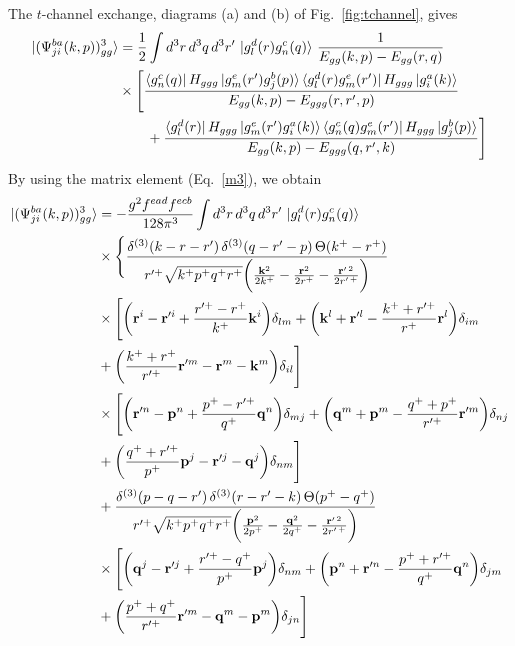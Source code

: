 \documentclass[a4paper,11pt]{article}
\def\v#1{\mathbf{#1}}
\begin{document}
{\noindent The $t$-channel exchange, diagrams (a) and (b) of Fig.~\ref{fig:tchannel}, gives
\begin{align}
\ket{(\Psi^{ba}_{ji}(k,p))^{3}_{gg}} & = \frac{1}{2}\int d^{3}r\, d^{3}q\, d^{3}r^{\prime}\, \ket{g^{d}_{l}(r)g^{c}_{n}(q)}\,\frac{1}{E_{gg}(k,p)-E_{gg}(r,q)}\notag \\
& \times\Bigg[\frac{\bra{g^{c}_{n}(q)}H_{ggg}\ket{g^{e}_{m}(r^{\prime})g^{b}_{j}(p)}\bra{g^{d}_{l}(r)g^{e}_{m}(r^{\prime})}H_{ggg}\ket{g^{a}_{i}(k)}}{E_{gg}(k,p)-E_{ggg}(r,r^{\prime},p)}\notag \\ & \qquad +\frac{\bra{g^{d}_{l}(r)}H_{ggg}\ket{g^{e}_{m}(r^{\prime})g^{a}_{i}(k)}\bra{g^{c}_{n}(q)g^{e}_{m}(r^{\prime})}H_{ggg}\ket{g^{b}_{j}(p)}}{E_{gg}(k,p)-E_{ggg}(q,r^{\prime},k)}\Bigg]
\end{align}
By using the matrix element (Eq.~\eqref{m3}), we obtain
\begin{align}\label{eq:tch}
\ket{(\Psi^{ba}_{ji}(k,p))^{3}_{gg}} & = -\frac{g^{2}f^{ead}f^{ecb}}{128\pi^{3}}\int d^{3}r\, d^{3}q\, d^{3}r^{\prime}\, \ket{g^{d}_{l}(r)g^{c}_{n}(q)}\notag \\
& \times\Bigg\{\frac{\delta^{(3)}(k-r-r^{\prime})\,\delta^{(3)}(q-r^{\prime}-p)\,\Theta(k^{+}-r^{+})}{r^{\prime +}\sqrt{k^{+}p^{+}q^{+}r^{+}}\bigg(\frac{\v{k}^{2}}{2k^{+}}-\frac{\v{r}^{2}}{2r^{+}}-\frac{\v{r}^{\prime\,2}}{2r^{\prime\,+}}\bigg)}\notag \\
& \times\Bigg[\bigg(\v{r}^{i}-\v{r}^{\prime i}+\frac{r^{\prime +}-r^{+}}{k^{+}}\v{k}^{i}\bigg)\delta_{lm}+\bigg(\v{k}^{l}+\v{r}^{\prime l}-\frac{k^{+}+r^{\prime +}}{r^{+}}\v{r}^{l}\bigg)\delta_{im}\notag \\ & +\bigg(\frac{k^{+}+r^{+}}{r^{\prime +}}\v{r}^{\prime m}-\v{r}^{m}-\v{k}^{m}\bigg)\delta_{il}\Bigg]\notag \\
& \times\Bigg[\bigg(\v{r}^{\prime n}-\v{p}^{n}+\frac{p^{+}-r^{\prime +}}{q^{+}}\v{q}^{n}\bigg)\delta_{mj}+\bigg(\v{q}^{m}+\v{p}^{m}-\frac{q^{+}+p^{+}}{r^{\prime +}}\v{r}^{\prime m}\bigg)\delta_{nj}\notag \\ & +\bigg(\frac{q^{+}+r^{\prime +}}{p^{+}}\v{p}^{j}-\v{r}^{\prime j}-\v{q}^{j}\bigg)\delta_{nm}\Bigg]\notag \\
& +\frac{\delta^{(3)}(p-q-r^{\prime})\,\delta^{(3)}(r-r^{\prime}-k)\,\Theta(p^{+}-q^{+})}{r^{\prime +}\sqrt{k^{+}p^{+}q^{+}r^{+}}\bigg(\frac{\v{p}^{2}}{2p^{+}}-\frac{\v{q}^{2}}{2q^{+}}-\frac{\v{r}^{\prime\,2}}{2r^{\prime\,+}}\bigg)}\notag \\
& \times\Bigg[\bigg(\v{q}^{j}-\v{r}^{\prime j}+\frac{r^{\prime +}-q^{+}}{p^{+}}\v{p}^{j}\bigg)\delta_{nm}+\bigg(\v{p}^{n}+\v{r}^{\prime n}-\frac{p^{+}+r^{\prime +}}{q^{+}}\v{q}^{n}\bigg)\delta_{jm}\notag \\ & +\bigg(\frac{p^{+}+q^{+}}{r^{\prime +}}\v{r}^{\prime m}-\v{q}^{m}-\v{p}^{m}\bigg)\delta_{jn}\Bigg]\notag \\

\end{align}}
\end{document}

